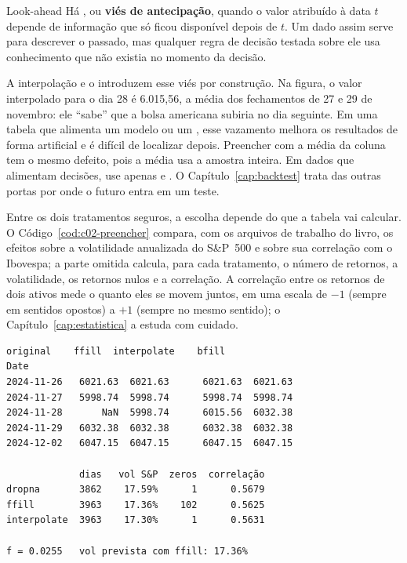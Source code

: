 
\begin{definicao}{Look-ahead}
Há , ou \textbf{viés de antecipação}, quando o valor atribuído à data $t$ depende de informação que só ficou disponível depois de $t$. Um dado assim serve para descrever o passado, mas qualquer regra de decisão testada sobre ele usa conhecimento que não existia no momento da decisão.
\end{definicao}

A interpolação e o  introduzem esse viés por construção. Na figura, o valor interpolado para o dia 28 é 6.015,56, a média dos fechamentos de 27 e 29 de novembro: ele ``sabe'' que a bolsa americana subiria no dia seguinte. Em uma tabela que alimenta um modelo ou um , esse vazamento melhora os resultados de forma artificial e é difícil de localizar depois. Preencher com a média da coluna tem o mesmo defeito, pois a média usa a amostra inteira. Em dados que alimentam decisões, use apenas  e . O Capítulo~\ref{cap:backtest} trata das outras portas por onde o futuro entra em um teste.

Entre os dois tratamentos seguros, a escolha depende do que a tabela vai calcular. O Código~\ref{cod:c02-preencher} compara, com os arquivos de trabalho do livro, os efeitos sobre a volatilidade anualizada do S\&P~500 e sobre sua correlação com o Ibovespa; a parte omitida calcula, para cada tratamento, o número de retornos, a volatilidade, os retornos nulos e a correlação. A correlação entre os retornos de dois ativos mede o quanto eles se movem juntos, em uma escala de $-1$ (sempre em sentidos opostos) a $+1$ (sempre no mesmo sentido); o Capítulo~\ref{cap:estatistica} a estuda com cuidado.


\begin{lstlisting}[style=saida]
            original    ffill  interpolate    bfill
Date
2024-11-26   6021.63  6021.63      6021.63  6021.63
2024-11-27   5998.74  5998.74      5998.74  5998.74
2024-11-28       NaN  5998.74      6015.56  6032.38
2024-11-29   6032.38  6032.38      6032.38  6032.38
2024-12-02   6047.15  6047.15      6047.15  6047.15

             dias   vol S&P  zeros  correlação
dropna       3862    17.59%      1      0.5679
ffill        3963    17.36%    102      0.5625
interpolate  3963    17.30%      1      0.5631

f = 0.0255   vol prevista com ffill: 17.36%
\end{lstlisting}

